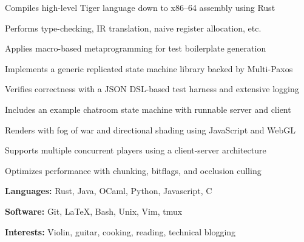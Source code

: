 \documentclass{resume}
\begin{document}
\begin{projects}
    \begin{description}
        \item Compiles high-level Tiger language down to x86--64 assembly using Rust
        \item Performs type-checking, IR translation, naive register allocation, etc.
        \item Applies macro-based metaprogramming for test boilerplate generation
    \end{description}

    \begin{description}
        \item Implements a generic replicated state machine library backed by Multi-Paxos
        \item Verifies correctness with a JSON DSL-based test harness and extensive logging
        \item Includes an example chatroom state machine with runnable server and client
    \end{description}

    \begin{description}
        \item Renders with fog of war and directional shading using JavaScript and WebGL
        \item Supports multiple concurrent players using a client-server architecture
        \item Optimizes performance with chunking, bitflags, and occlusion culling
    \end{description}
\end{projects}

\begin{skills}
    \begin{description}
        \item \textbf{Languages:} Rust, Java, OCaml, Python, Javascript, C
        \item \textbf{Software:} Git, LaTeX, Bash, Unix, Vim, tmux
        \item \textbf{Interests:} Violin, guitar, cooking, reading, technical blogging
    \end{description}
\end{skills}
\end{document}
